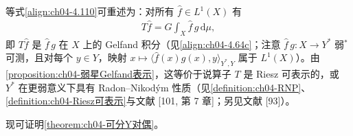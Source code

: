 \documentclass[../../main.tex]{subfiles}%
\begin{document}
\begin{remark}\label{remark:ch04-Gelfand表示}
等式\eqref{align:ch04-4.110}可重述为：对所有 $\hat f\in L^1(X)$ 有
\begin{align*}
T\hat f=G\!\int_X\hat f\,g\,\mathrm{d}\mu,
\end{align*}
即 $T\hat f$ 是 $\hat f\,g$ 在 $X$ 上的 Gelfand 积分（见\eqref{align:ch04-4.64c}；注意 $\hat f\,g:X\to Y^*$ 弱$^*$可测，且对每个 $y\in Y$，映射 $x\mapsto\langle\hat f(x)g(x),y\rangle_{Y^*,Y}$ 属于 $L^1(X)$）。由\cref{proposition:ch04-弱星Gelfand表示}，这等价于说算子 $T$ 是 Riesz 可表示的，或 $Y^*$ 在更弱意义下具有 Radon--Nikodým 性质（见\cref{definition:ch04-RNP}、\cref{definition:ch04-Riesz可表示}与文献 [101, 第 7 章]；另见文献 [93]）。
\end{remark}

现可证明\cref{theorem:ch04-可分Y对偶}。
\end{document}

